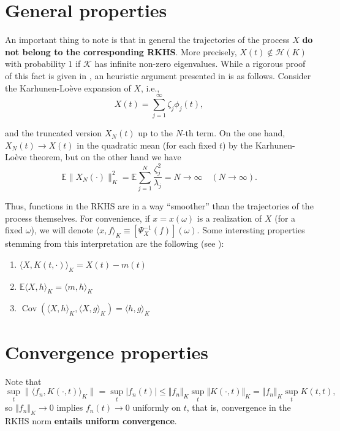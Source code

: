 \section*{General properties}

  An important thing to note is that in general the trajectories of the process $X$ \textbf{do not belong to the corresponding RKHS}. More precisely, $X(t)\notin \mathcal H(K)$ with probability $1$ if $\mathcal K$ has infinite non-zero eigenvalues. While a rigorous proof of this fact is given in \citet{hajek1962}, an heuristic argument presented in \citet{wahba1990} is as follows. Consider the Karhunen-Loève expansion of $X$, i.e.,
  \[
  X(t) = \sum_{j=1}^\infty \zeta_j \phi_j(t),
  \]

  and the truncated version $X_N(t)$ up to the $N$-th term. On the one hand, $X_N(t)\to X(t)$ in the quadratic mean (for each fixed $t$) by the Karhunen-Loève theorem, but on the other hand we have
  \[
\mathbb E\|X_N(\cdot)\|^2_K = \mathbb E \sum_{j=1}^N \frac{\zeta_j^2}{\lambda_j} = N \to \infty \quad (N\to\infty).
  \]

  Thus, functions in the RKHS are in a way ``smoother'' than the trajectories of the process themselves. For convenience, if $x=x(\omega)$ is a realization of $X$ (for a fixed $\omega$), we will denote $\langle x, f\rangle_K \equiv \left[\Psi_X^{-1}(f)\right](\omega)$. Some interesting properties stemming from this interpretation are the following (see \citet[p.~974]{parzen1961b}):

  \begin{enumerate}

    \item $\langle X, K(t, \cdot)\rangle_K = X(t) - m(t)$

    \item $\mathbb{E} \langle X, h\rangle_K = \langle m, h\rangle_K$

    \item $\operatorname{Cov}\left(\langle X, h \rangle_K , \langle X, g\rangle_K\right) = \langle h, g\rangle_K$

  \end{enumerate}


\section*{Convergence properties}

Note that
\[
		\sup_t \|\langle f_n,K(\cdot,t)\rangle_K\|=\sup_t|f_n(t)|\leq \Vert f_n\Vert_K \sup_t\Vert K(\cdot,t)\Vert_K
		=\Vert f_n\Vert_K \sup_t K(t,t),
\]
		so $\Vert f_n\Vert_K \to 0$ implies $f_n(t)\to 0$ uniformly on $t$, that is, convergence in the RKHS norm \textbf{entails uniform convergence}.

